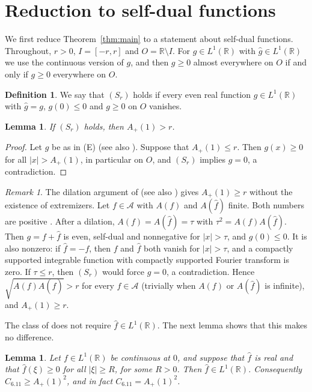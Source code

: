 \documentclass[11pt]{amsart}
\newtheorem{lemma}[theorem]{Lemma}
\theoremstyle{definition}
\newtheorem{definition}[theorem]{Definition}
\theoremstyle{remark}
\newtheorem{remark}[theorem]{Remark}
\numberwithin{equation}{section}
\newcommand{\R}{\mathbb{R}}
\newcommand{\cA}{\mathcal{A}}
\newcommand{\ft}[1]{\widehat{#1}}
\newcommand{\Ap}{A_+(1)}
\newcommand{\Csix}{C_{6.11}}
\begin{document}
\section{Reduction to self-dual functions}\label{sec:reduction}

We first reduce Theorem~\ref{thm:main} to a statement about self-dual functions. Throughout, $r>0$, $I=[-r,r]$ and $O=\R\setminus I$. For $g\in L^1(\R)$ with $\ft g\in L^1(\R)$ we use the continuous version of $g$, and then $g\ge0$ almost everywhere on $O$ if and only if $g\ge0$ everywhere on $O$.

\begin{definition}\label{def:Sr}
We say that $(S_r)$ holds if every even real function $g\in L^1(\R)$ with $\ft g=g$, $g(0)\le0$ and $g\ge0$ on $O$ vanishes.
\end{definition}

\begin{lemma}\label{lem:reduction}
If $(S_r)$ holds, then $\Ap>r$.
\end{lemma}

\begin{proof}
Let $g$ be as in \textup{(E)} (see also \cite[Theorem~1.4]{CG19}). Suppose that $\Ap\le r$. Then $g(x)\ge0$ for all $|x|>\Ap$, in particular on $O$, and $(S_r)$ implies $g=0$, a contradiction.
\end{proof}

\begin{remark}\label{rem:nonstrict}
The dilation argument of \cite[Section~1]{BCK10} (see also \cite[Section~3.3]{GOS17}) gives $\Ap\ge r$ without the existence of extremizers. Let $f\in\cA$ with $A(f)$ and $A(\ft f)$ finite. Both numbers are positive \cite[Section~1.1]{GOS17}. After a dilation, $A(f)=A(\ft f)=\tau$ with $\tau^2=A(f)A(\ft f)$. Then $g=f+\ft f$ is even, self-dual and nonnegative for $|x|>\tau$, and $g(0)\le0$. It is also nonzero: if $\ft f=-f$, then $f$ and $\ft f$ both vanish for $|x|>\tau$, and a compactly supported integrable function with compactly supported Fourier transform is zero. If $\tau\le r$, then $(S_r)$ would force $g=0$, a contradiction. Hence $\sqrt{A(f)A(\ft f)}>r$ for every $f\in\cA$ (trivially when $A(f)$ or $A(\ft f)$ is infinite), and $\Ap\ge r$.
\end{remark}

The class of \cite[Problem~6.11]{GGTW25} does not require $\ft f\in L^1(\R)$. The next lemma shows that this makes no difference.

\begin{lemma}\label{lem:class}
Let $f\in L^1(\R)$ be continuous at $0$, and suppose that $\ft f$ is real and that $\ft f(\xi)\ge0$ for all $|\xi|\ge R$, for some $R>0$. Then $\ft f\in L^1(\R)$. Consequently $\Csix\ge\Ap^2$, and in fact $\Csix=\Ap^2$.
\end{lemma}
\end{document}
